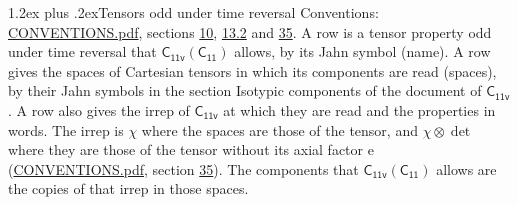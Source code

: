 \documentclass[10pt,a4paper]{article}
\makeatletter
\renewcommand\section{\@startsection{section}{1}{\z@}{-3ex plus -1ex minus -.2ex}%
  {1.2ex plus .2ex}{\normalfont\large\sffamily\bfseries\color{parttitle}}}
\numberwithin{equation}{section}
\newcommand{\grp}[1]{\mathsf{#1}}
\newcommand{\irrprod}{\otimes}
\makeatother
\begin{document}
\section{Tensors odd under time reversal}\label{s:time_odd}
Conventions: \href{../../CONVENTIONS.pdf}{CONVENTIONS.pdf}, sections \href{../../../rotation/CONVENTIONS.pdf\#conv.10}{10}, \href{../../../rotation/CONVENTIONS.pdf\#conv.13.2}{13.2} and \href{../../CONVENTIONS.pdf\#conv.35}{35}.
\leavevmode\label{n:head.name.property}A row is a tensor property odd under time reversal that $\grp{C_{11v}}(\grp{C_{11}})$ allows, by its Jahn symbol (name). \label{n:head.spaces}A row gives the spaces of Cartesian tensors in which its components are read (spaces), by their Jahn symbols in the section Isotypic components of the document of \href{../../../rotation/data/pdf/C11v.pdf}{$\grp{C_{11v}}$}. \label{n:head.properties}A row also gives the irrep of $\grp{C_{11v}}$ at which they are read and the properties in words. The irrep is $\chi$ where the spaces are those of the tensor, and $\chi \irrprod \det$ where they are those of the tensor without its axial factor e (\href{../../CONVENTIONS.pdf}{CONVENTIONS.pdf}, section \href{../../CONVENTIONS.pdf\#conv.35}{35}). The components that $\grp{C_{11v}}(\grp{C_{11}})$ allows are the copies of that irrep in those spaces.
\end{document}
